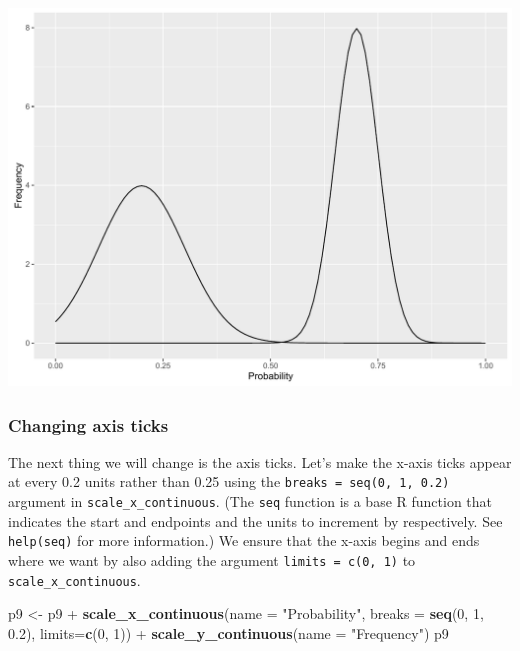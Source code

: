 \documentclass[]{article}
\newenvironment{Shaded}{\begin{snugshade}}{\end{snugshade}}
\newcommand{\KeywordTok}[1]{\textcolor[rgb]{0.13,0.29,0.53}{\textbf{{#1}}}}
\newcommand{\DataTypeTok}[1]{\textcolor[rgb]{0.13,0.29,0.53}{{#1}}}
\newcommand{\DecValTok}[1]{\textcolor[rgb]{0.00,0.00,0.81}{{#1}}}
\newcommand{\FloatTok}[1]{\textcolor[rgb]{0.00,0.00,0.81}{{#1}}}
\newcommand{\StringTok}[1]{\textcolor[rgb]{0.31,0.60,0.02}{{#1}}}
\newcommand{\NormalTok}[1]{{#1}}
\begin{document}
\begin{center}\includegraphics{0_all_posts_pdf/function_5-1} \end{center}

\subsubsection{Changing axis ticks}\label{changing-axis-ticks-2}

The next thing we will change is the axis ticks. Let's make the x-axis
ticks appear at every 0.2 units rather than 0.25 using the
\texttt{breaks\ =\ seq(0,\ 1,\ 0.2)} argument in
\texttt{scale\_x\_continuous}. (The \texttt{seq} function is a base R
function that indicates the start and endpoints and the units to
increment by respectively. See \texttt{help(seq)} for more information.)
We ensure that the x-axis begins and ends where we want by also adding
the argument \texttt{limits\ =\ c(0,\ 1)} to
\texttt{scale\_x\_continuous}.

\begin{Shaded}
\begin{Highlighting}[]
\NormalTok{p9 <-}\StringTok{ }\NormalTok{p9 +}\StringTok{ }\KeywordTok{scale_x_continuous}\NormalTok{(}\DataTypeTok{name =} \StringTok{"Probability"}\NormalTok{,}
                              \DataTypeTok{breaks =} \KeywordTok{seq}\NormalTok{(}\DecValTok{0}\NormalTok{, }\DecValTok{1}\NormalTok{, }\FloatTok{0.2}\NormalTok{),}
                              \DataTypeTok{limits=}\KeywordTok{c}\NormalTok{(}\DecValTok{0}\NormalTok{, }\DecValTok{1}\NormalTok{)) +}
\StringTok{      }\KeywordTok{scale_y_continuous}\NormalTok{(}\DataTypeTok{name =} \StringTok{"Frequency"}\NormalTok{)}
\NormalTok{p9}
\end{Highlighting}
\end{Shaded}
\end{document}

